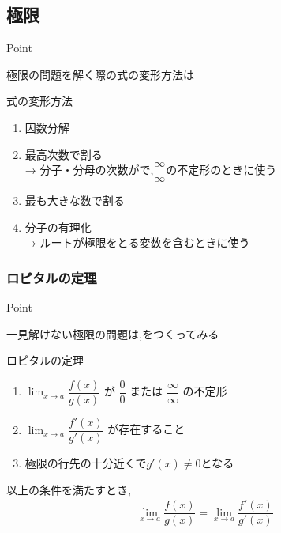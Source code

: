 \documentclass[a4paper]{jsarticle}
\begin{document}
\subsection{極限}
\begin{itembox}[l]{Point}
    \begin{center}
        極限の問題を解く際の式の変形方法は
    \end{center}
\end{itembox}
\begin{itembox}[l]{式の変形方法}
    \begin{enumerate}[(1)]
        \item 因数分解
        \item 最高次数で割る\\
              → 分子・分母の次数がで,$\dfrac{\infty}{\infty}$の不定形のときに使う
        \item 最も大きな数で割る
        \item 分子の有理化\\
              → ルートが極限をとる変数を含むときに使う
    \end{enumerate}
\end{itembox}
\subsubsection{ロピタルの定理}
\begin{itembox}[l]{Point}
    \begin{center}
        一見解けない極限の問題は,をつくってみる
    \end{center}
\end{itembox}
\begin{itembox}[l]{ロピタルの定理}
    \begin{enumerate}[(1)]
        \item $\displaystyle\lim_{x\rightarrow a}\dfrac{f\left(x\right)}{g\left(x\right)}$ が $\dfrac{0}{0}$ または $\dfrac{\infty}{\infty}$ の不定形\\
        \item $\displaystyle\lim_{x\rightarrow a}\dfrac{f'\left(x\right)}{g'\left(x\right)}$ が存在すること
        \item 極限の行先の十分近くで$g'\left(x\right)\neq 0$となる
    \end{enumerate}
    以上の条件を満たすとき,
    \begin{eqnarray*}
        \lim_{x\rightarrow a}\dfrac{f\left(x\right)}{g\left(x\right)}=\lim_{x\rightarrow a}\dfrac{f'\left(x\right)}{g'\left(x\right)}\\
    \end{eqnarray*}
\end{itembox}
\end{document}
